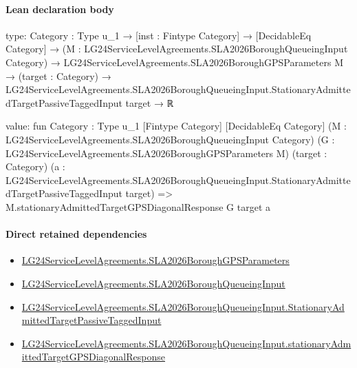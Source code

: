 \documentclass[10pt]{article}
\begin{document}
\paragraph{Lean declaration body}
\begin{ReviewVerbatim}
type:
{Category : Type u_1} →
  [inst : Fintype Category] →
    [DecidableEq Category] →
      (M : LG24ServiceLevelAgreements.SLA2026BoroughQueueingInput Category) →
        LG24ServiceLevelAgreements.SLA2026BoroughGPSParameters M →
          (target : Category) →
            LG24ServiceLevelAgreements.SLA2026BoroughQueueingInput.StationaryAdmittedTargetPassiveTaggedInput target → ℝ

value:
fun {Category : Type u_1} [Fintype Category] [DecidableEq Category]
    (M : LG24ServiceLevelAgreements.SLA2026BoroughQueueingInput Category)
    (G : LG24ServiceLevelAgreements.SLA2026BoroughGPSParameters M) (target : Category)
    (a : LG24ServiceLevelAgreements.SLA2026BoroughQueueingInput.StationaryAdmittedTargetPassiveTaggedInput target) =>
  M.stationaryAdmittedTargetGPSDiagonalResponse G target a
\end{ReviewVerbatim}

\paragraph{Direct retained dependencies}
\begin{itemize}\raggedright
\item \hyperlink{governing-declaration-e9a32ba0a8f4decc}{LG24\allowbreak{}Service\allowbreak{}Level\allowbreak{}Agreements.\allowbreak{}SLA2026\allowbreak{}Borough\allowbreak{}GPS\allowbreak{}Parameters}
\item \hyperlink{governing-declaration-3e29dad51cd2861a}{LG24\allowbreak{}Service\allowbreak{}Level\allowbreak{}Agreements.\allowbreak{}SLA2026\allowbreak{}Borough\allowbreak{}Queueing\allowbreak{}Input}
\item \hyperlink{governing-declaration-8796a25a610eaea9}{LG24\allowbreak{}Service\allowbreak{}Level\allowbreak{}Agreements.\allowbreak{}SLA2026\allowbreak{}Borough\allowbreak{}Queueing\allowbreak{}Input.\allowbreak{}Stationary\allowbreak{}Admitted\allowbreak{}Target\allowbreak{}Passive\allowbreak{}Tagged\allowbreak{}Input}
\item \hyperlink{governing-declaration-badb1618358c2b22}{LG24\allowbreak{}Service\allowbreak{}Level\allowbreak{}Agreements.\allowbreak{}SLA2026\allowbreak{}Borough\allowbreak{}Queueing\allowbreak{}Input.\allowbreak{}stationary\allowbreak{}Admitted\allowbreak{}Target\allowbreak{}GPS\allowbreak{}Diagonal\allowbreak{}Response}
\end{itemize}
\hypertarget{governing-declaration-779c70891263f8f1}{}
\end{document}
